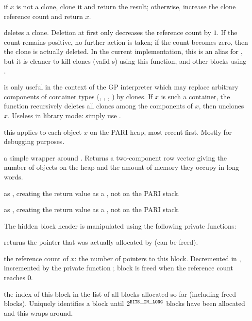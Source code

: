  if $x$ is not a clone, clone it and return the
result; otherwise, increase the clone reference count and return $x$.

 deletes a clone. Deletion at first only decreases
the reference count by $1$. If the count remains positive, no further action is
taken; if the count becomes zero, then the clone is actually deleted. In the
current implementation, this is an alias for , but it is cleaner
to kill clones (valid s) using this function, and other blocks using
.

 is only useful in the context of the GP
interpreter which may replace arbitrary components of container types
(, , , ) by clones. If $x$ is such
a container, the function recursively deletes all clones among the components
of $x$, then unclones $x$. Useless in library mode: simply use
.

 this applies
 to each object $x$ on the PARI heap, most recent
first. Mostly for debugging purposes.

 a simple wrapper around . Returns  a
two-component row vector giving the number of objects on the heap and the
amount of memory they occupy in long words.

 as , creating the return
value as a , not on the PARI stack.

 as , creating the return
value as a , not on the PARI stack.

 The hidden block header is manipulated using the
following private functions:

 returns the pointer that was actually allocated
by  (can be freed).

 the reference count of $x$: the number of pointers
to this block. Decremented in , incremented by the private
function ; block is freed when the reference
count reaches $0$.

 the index of this block in the list of all blocks
allocated so far (including freed blocks). Uniquely identifies a block until
$2^{\tt BITS\_IN\_LONG}$ blocks have been allocated and this wraps around.

